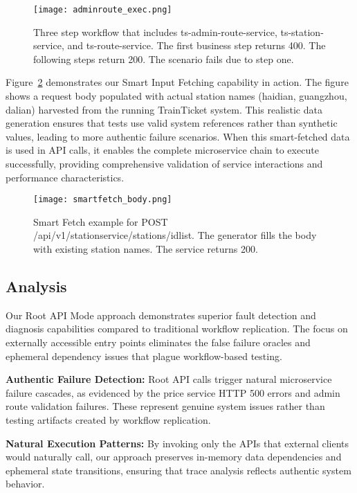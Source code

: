 \documentclass[conference]{IEEEtran}
\begin{document}
\begin{figure}[!t]
\centering
\texttt{[image: adminroute\_exec.png]}
\caption{Three step workflow that includes ts-admin-route-service, ts-station-service, and ts-route-service. The first business step returns 400. The following steps return 200. The scenario fails due to step one.}
\label{fig:adminroute_exec}
\end{figure}

Figure~\ref{fig:smartfetch_body} demonstrates our Smart Input Fetching capability in action. The figure shows a request body populated with actual station names (haidian, guangzhou, dalian) harvested from the running TrainTicket system. This realistic data generation ensures that tests use valid system references rather than synthetic values, leading to more authentic failure scenarios. When this smart-fetched data is used in API calls, it enables the complete microservice chain to execute successfully, providing comprehensive validation of service interactions and performance characteristics.

\begin{figure}[!t]
\centering
\texttt{[image: smartfetch\_body.png]}
\caption{Smart Fetch example for POST /api\slash v1\slash stationservice\slash stations\slash idlist. The generator fills the body with existing station names. The service returns 200.}
\label{fig:smartfetch_body}
\end{figure}

\subsection{Analysis}
Our Root API Mode approach demonstrates superior fault detection and diagnosis capabilities compared to traditional workflow replication. The focus on externally accessible entry points eliminates the false failure oracles and ephemeral dependency issues that plague workflow-based testing.

\textbf{Authentic Failure Detection:} Root API calls trigger natural microservice failure cascades, as evidenced by the price service HTTP 500 errors and admin route validation failures. These represent genuine system issues rather than testing artifacts created by workflow replication.

\textbf{Natural Execution Patterns:} By invoking only the APIs that external clients would naturally call, our approach preserves in-memory data dependencies and ephemeral state transitions, ensuring that trace analysis reflects authentic system behavior.
\end{document}
